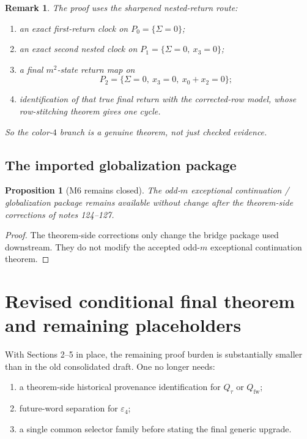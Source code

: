 \documentclass[11pt]{article}
\newtheorem{proposition}[theorem]{Proposition}
\newtheorem{remark}[theorem]{Remark}
\newcommand{\eps}{\varepsilon}
\begin{document}
\begin{remark}
The proof uses the sharpened nested-return route:
\begin{enumerate}[label=\textup{(\arabic*)},leftmargin=2.5em]
\item an exact first-return clock on $P_0=\{\Sigma=0\}$;
\item an exact second nested clock on $P_1=\{\Sigma=0,\ x_3=0\}$;
\item a final $m^2$-state return map on
      \[
      P_2=\{\Sigma=0,\ x_3=0,\ x_0+x_2=0\};
      \]
\item identification of that true final return with the corrected-row model,
      whose row-stitching theorem gives one cycle.
\end{enumerate}
So the color-$4$ branch is a genuine theorem, not just checked evidence.
\end{remark}

\subsection{The imported globalization package}

\begin{proposition}[M6 remains closed]
\label{prop:M6-closed}
The odd-$m$ exceptional continuation / globalization package remains available
without change after the theorem-side corrections of notes 124--127.
\end{proposition}

\begin{proof}
The theorem-side corrections only change the bridge package used downstream.
They do not modify the accepted odd-$m$ exceptional continuation theorem.
\end{proof}

\section{Revised conditional final theorem and remaining placeholders}

With Sections 2--5 in place, the remaining proof burden is substantially smaller
than in the old consolidated draft.
One no longer needs:
\begin{enumerate}[label=\textup{(\roman*)},leftmargin=2.5em]
\item a theorem-side historical provenance identification for $Q_{\tau}$ or
      $Q_{\mathrm{fw}}$;
\item future-word separation for $\eps_4$;
\item a single common selector family before stating the final generic upgrade.
\end{enumerate}
\end{document}
